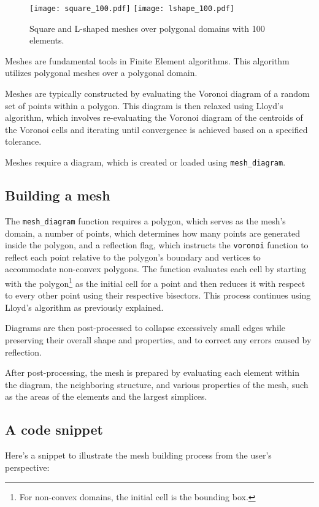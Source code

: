 \begin{figure}[!ht]
	\centering
	\texttt{[image: square\_100.pdf]}
    \texttt{[image: lshape\_100.pdf]}
	\caption{Square and L-shaped meshes over polygonal domains with 100 elements.}
\end{figure}

Meshes are fundamental tools in Finite Element algorithms. This algorithm utilizes polygonal meshes over a polygonal domain.

\cite{Talischi2012} Meshes are typically constructed by evaluating the Voronoi diagram of a random set of points within a polygon. This diagram is then relaxed using Lloyd's algorithm, which involves re-evaluating the Voronoi diagram of the centroids of the Voronoi cells and iterating until convergence is achieved based on a specified tolerance.

Meshes require a diagram, which is created or loaded using \lstinline{mesh_diagram}.

\subsection{Building a mesh}

The \lstinline{mesh_diagram} function requires a polygon, which serves as the mesh's domain, a number of points, which determines how many points are generated inside the polygon, and a reflection flag, which instructs the \lstinline{voronoi} function to reflect each point relative to the polygon's boundary and vertices to accommodate non-convex polygons. The function evaluates each cell by starting with the polygon\footnote{For non-convex domains, the initial cell is the bounding box.} as the initial cell for a point and then reduces it with respect to every other point using their respective bisectors. This process continues using Lloyd's algorithm as previously explained.

Diagrams are then post-processed to collapse excessively small edges while preserving their overall shape and properties, and to correct any errors caused by reflection.

After post-processing, the mesh is prepared by evaluating each element within the diagram, the neighboring structure, and various properties of the mesh, such as the areas of the elements and the largest simplices.

\newpage
\subsection{A code snippet}

Here's a snippet to illustrate the mesh building process from the user's perspective:

